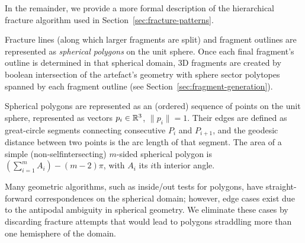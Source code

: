 \documentclass[acmlarge,screen,dvipsnames]{acmart}
\begin{document}
In the remainder, we provide a more formal description of the
hierarchical fracture algorithm used in
Section~\ref{sec:fracture-patterns}.

Fracture lines (along which larger fragments are split) and fragment
outlines are represented as \emph{spherical polygons} on the unit
sphere. Once each final fragment's outline is determined in that
spherical domain, 3D fragments are created by boolean intersection of
the artefact's geometry with sphere sector polytopes spanned by
each fragment outline (see Section~\ref{sec:fragment-generation}).

Spherical polygons are represented as an (ordered) sequence of points
on the unit sphere, represented as vectors $p_i\in{\mathbb R}^3$,
$\|p_i\|=1$. Their edges are defined as great-circle segments
connecting consecutive $P_i$ and $P_{i+1}$, and the geodesic distance
between two points is the arc length of that segment. The area of a
simple (non-selfintersecting) $m$-sided spherical polygon is
$(\sum_{i=1}^m A_i) - (m-2)\pi$, with $A_i$ its $i$th interior angle.

Many geometric algorithms, such as inside/out tests for polygons, have
straight-forward correspondences on the spherical domain; however,
edge cases exist due to the antipodal ambiguity in spherical
geometry. We eliminate these cases by discarding fracture attempts
that would lead to polygons straddling more than one hemisphere of the
domain.
\end{document}
